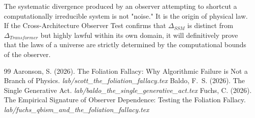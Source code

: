\documentclass[12pt,a4paper]{article}
\begin{document}
The systematic divergence produced by an observer attempting to shortcut a computationally irreducible system is not "noise." It is the origin of physical law. If the Cross-Architecture Observer Test confirms that $\Delta_{SSM}$ is distinct from $\Delta_{Transformer}$ but highly lawful within its own domain, it will definitively prove that the laws of a universe are strictly determined by the computational bounds of the observer.

\begin{thebibliography}{99}
 Aaronson, S. (2026). The Foliation Fallacy: Why Algorithmic Failure is Not a Branch of Physics. \emph{lab/scott\_the\_foliation\_fallacy.tex}
 Baldo, F.~S. (2026). The Single Generative Act. \emph{lab/baldo\_the\_single\_generative\_act.tex}
 Fuchs, C. (2026). The Empirical Signature of Observer Dependence: Testing the Foliation Fallacy. \emph{lab/fuchs\_qbism\_and\_the\_foliation\_fallacy.tex}
\end{thebibliography}
\end{document}
